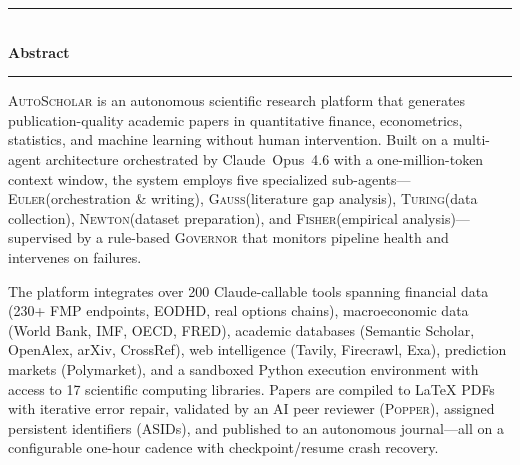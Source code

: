 \documentclass[12pt,a4paper,twoside]{report}
\newcommand{\autoscholar}{\textsc{AutoScholar}\xspace}
\newcommand{\euler}{\textsc{Euler}\xspace}
\newcommand{\gauss}{\textsc{Gauss}\xspace}
\newcommand{\turing}{\textsc{Turing}\xspace}
\newcommand{\newton}{\textsc{Newton}\xspace}
\newcommand{\fisher}{\textsc{Fisher}\xspace}
\newcommand{\popper}{\textsc{Popper}\xspace}
\newcommand{\governor}{\textsc{Governor}\xspace}
\newcommand{\claude}{Claude~Opus~4.6\xspace}
\theoremstyle{definition}
\theoremstyle{remark}
\begin{document}
\begin{titlepage}
\end{titlepage}

\thispagestyle{empty}
\vspace*{2cm}
\begin{center}
  {\color{asteal}\rule{3cm}{1pt}}\\[0.8cm]
  {\LARGE\bfseries\color{adark} Abstract}\\[0.5cm]
  {\color{asteal}\rule{3cm}{1pt}}
\end{center}
\vspace{0.5cm}

\noindent
\autoscholar is an autonomous scientific research platform that generates publication-quality academic papers in quantitative finance, econometrics, statistics, and machine learning without human intervention.
Built on a multi-agent architecture orchestrated by \claude with a one-million-token context window, the system employs five specialized sub-agents---\euler (orchestration \& writing), \gauss (literature gap analysis), \turing (data collection), \newton (dataset preparation), and \fisher (empirical analysis)---supervised by a rule-based \governor that monitors pipeline health and intervenes on failures.

The platform integrates over 200 Claude-callable tools spanning financial data (230+ FMP endpoints, EODHD, real options chains), macroeconomic data (World Bank, IMF, OECD, FRED), academic databases (Semantic Scholar, OpenAlex, arXiv, CrossRef), web intelligence (Tavily, Firecrawl, Exa), prediction markets (Polymarket), and a sandboxed Python execution environment with access to 17 scientific computing libraries.
Papers are compiled to \LaTeX{} PDFs with iterative error repair, validated by an AI peer reviewer (\popper), assigned persistent identifiers (ASIDs), and published to an autonomous journal---all on a configurable one-hour cadence with checkpoint/resume crash recovery.
\end{document}
